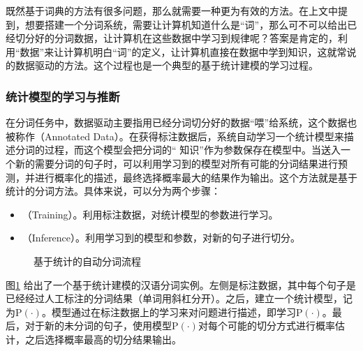 \parinterval 既然基于词典的方法有很多问题，那么就需要一种更为有效的方法。在上文中提到，想要搭建一个分词系统，需要让计算机知道什么是``词''，那么可不可以给出已经切分好的分词数据，让计算机在这些数据中学习到规律呢？答案是肯定的，利用``数据''来让计算机明白``词''的定义，让计算机直接在数据中学到知识，这就常说的数据驱动的方法。这个过程也是一个典型的基于统计建模的学习过程。


\subsubsection{统计模型的学习与推断}

\parinterval 在分词任务中，数据驱动主要指用已经分词切分好的数据``喂''给系统，这个数据也被称作{\small{}}（Annotated Data）。在获得标注数据后，系统自动学习一个统计模型来描述分词的过程，而这个模型会把分词的`` 知识''作为参数保存在模型中。当送入一个新的需要分词的句子时，可以利用学习到的模型对所有可能的分词结果进行预测，并进行概率化的描述，最终选择概率最大的结果作为输出。这个方法就是基于统计的分词方法。具体来说，可以分为两个步骤：

\begin{itemize}
\vspace{0.5em}
\item {\small{}}（Training）。利用标注数据，对统计模型的参数进行学习。
\vspace{0.5em}
\item {\small{}}（Inference）。利用学习到的模型和参数，对新的句子进行切分。
\vspace{0.5em}
\end{itemize}

\begin{figure}[htp]
\centering

\caption{基于统计的自动分词流程}
\label{fig:2-10}
\end{figure}

\parinterval 图\ref{fig:2-10} 给出了一个基于统计建模的汉语分词实例。左侧是标注数据，其中每个句子是已经经过人工标注的分词结果（单词用斜杠分开）。之后，建立一个统计模型，记为$\textrm{P}(\cdot)$。模型通过在标注数据上的学习来对问题进行描述，即学习$\textrm{P}(\cdot)$。最后，对于新的未分词的句子，使用模型$\textrm{P}(\cdot)$对每个可能的切分方式进行概率估计，之后选择概率最高的切分结果输出。
\vspace{-0.5em}

